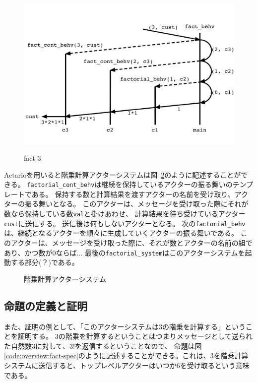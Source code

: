 \begin{figure}[tp]
  \centering
  \includegraphics[width=15cm]{./img/overview/fact.pdf}
  \label{img:overview:fact}
  \caption{fact 3}
\end{figure}

Actarioを用いると階乗計算アクターシステムは図~\ref{code:overview:fact-impl}のように記述することができる。
\texttt{factorial\_cont\_behv}は継続を保持しているアクターの振る舞いのテンプレートである。
保持する数と計算結果を渡すアクターの名前を受け取り、アクターの振る舞いとなる。
このアクターは、メッセージを受け取った際にそれが数なら保持している数\texttt{val}と掛けあわせ、
計算結果を待ち受けているアクター\texttt{cust}に送信する。
送信後は何もしないアクターとなる。
次の\texttt{factorial\_behv}は、継続となるアクターを順々に生成していくアクターの振る舞いである。
このアクターは、メッセージを受け取った際に、それが数とアクターの名前の組であり、かつ数が$0$ならば...
最後の\texttt{factorial\_system}はこのアクターシステムを起動する部分(？)である。

\begin{figure}[tp]
  
  \label{code:overview:fact-impl}
  \caption{階乗計算アクターシステム}
\end{figure}

\subsection{命題の定義と証明}

また、証明の例として、「このアクターシステムは3の階乗を計算する」ということを証明する。
3の階乗を計算するということはつまりメッセージとして送られた自然数$3$に対して、$3!$を返信するということなので、
命題は図\ref{code:overview:fact-spec}のように記述することができる。これは、$3$を階乗計算システムに送信すると、トップレベルアクターはいつか$6$を受け取るという意味である。

